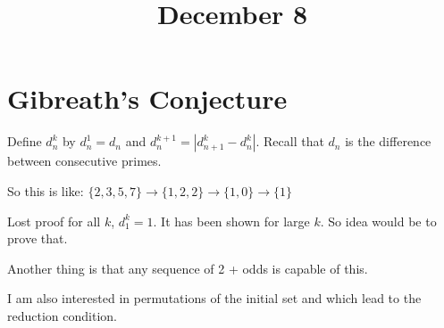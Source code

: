 \documentclass[11pt]{amsart}
\title{December 8}
\begin{document}
\maketitle
\section{Gibreath's Conjecture}
Define $d^k_n$ by $d^1_n = d_n$ and $d^{k+1}_n = \left|d^k_{n+1} - d^k_n\right|$. Recall that $d_n$ is the difference between consecutive primes.

So this is like: $\{ 2, 3, 5, 7 \} \rightarrow \{ 1, 2, 2 \} \rightarrow \{ 1, 0 \} \rightarrow \{ 1\}$

Lost proof for all $k$, $d^k_1 = 1$. It has been shown for large $k$. So idea would be to prove that. 

Another thing is that any sequence of 2 + odds is capable of this. 

I am also interested in permutations of the initial set and which lead to the reduction condition.
\end{document}
